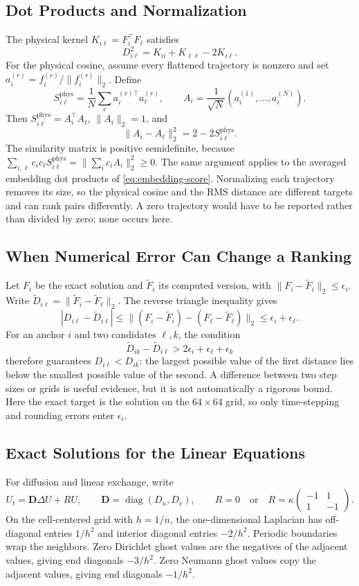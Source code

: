\subsection{Dot Products and Normalization}
\label{app:physical-kernel}
The physical kernel $K_{i\ell}=F_i^\top F_\ell$ satisfies
\[
 D_{i\ell}^2=K_{ii}+K_{\ell\ell}-2K_{i\ell}.
\]
For the physical cosine, assume every flattened trajectory is nonzero and set $a_i^{(r)}=f_i^{(r)}/\|f_i^{(r)}\|_2$. Define
\[
 S_{i\ell}^{\mathrm{phys}}=\frac1N\sum_r a_i^{(r)\top}a_\ell^{(r)},
 \qquad A_i=\frac1{\sqrt N}(a_i^{(1)},\ldots,a_i^{(N)}).
\]
Then $S_{i\ell}^{\mathrm{phys}}=A_i^\top A_\ell$, $\|A_i\|_2=1$, and
\[
 \|A_i-A_\ell\|_2^2=2-2S_{i\ell}^{\mathrm{phys}}.
\]
The similarity matrix is positive semidefinite, because
$\sum_{i,\ell}c_i c_\ell S_{i\ell}^{\mathrm{phys}}=\|\sum_i c_i A_i\|_2^2\geq0$.
The same argument applies to the averaged embedding dot products of \cref{eq:embedding-score}. Normalizing each trajectory removes its size, so the physical cosine and the RMS distance are different targets and can rank pairs differently. A zero trajectory would have to be reported rather than divided by zero; none occurs here.

\subsection{When Numerical Error Can Change a Ranking}
\label{app:ranking-error}
Let $F_i$ be the exact solution and $\widetilde F_i$ its computed version, with $\|F_i-\widetilde F_i\|_2\leq\epsilon_i$. Write $\widetilde D_{i\ell}=\|\widetilde F_i-\widetilde F_\ell\|_2$. The reverse triangle inequality gives
\[
 |D_{i\ell}-\widetilde D_{i\ell}|
 \leq\|(F_i-\widetilde F_i)-(F_\ell-\widetilde F_\ell)\|_2
 \leq\epsilon_i+\epsilon_\ell.
\]
For an anchor $i$ and two candidates $\ell,k$, the condition
\[
 \widetilde D_{ik}-\widetilde D_{i\ell}
 >2\epsilon_i+\epsilon_\ell+\epsilon_k
\]
therefore guarantees $D_{i\ell}<D_{ik}$: the largest possible value of the first distance lies below the smallest possible value of the second. A difference between two step sizes or grids is useful evidence, but it is not automatically a rigorous bound. Here the exact target is the solution on the $64\times64$ grid, so only time-stepping and rounding errors enter $\epsilon_i$.

\subsection{Exact Solutions for the Linear Equations}
\label{app:linear-reference}
For diffusion and linear exchange, write
\[
 U_t=\mathbf D\Delta U+RU,\qquad
 \mathbf D=\operatorname{diag}(D_u,D_v),\qquad
 R=0\quad\text{or}\quad
 R=\kappa\begin{pmatrix}-1&1\\1&-1\end{pmatrix}.
\]
On the cell-centered grid with $h=1/n$, the one-dimensional Laplacian has off-diagonal entries $1/h^2$ and interior diagonal entries $-2/h^2$. Periodic boundaries wrap the neighbors. Zero Dirichlet ghost values are the negatives of the adjacent values, giving end diagonals $-3/h^2$. Zero Neumann ghost values copy the adjacent values, giving end diagonals $-1/h^2$.

